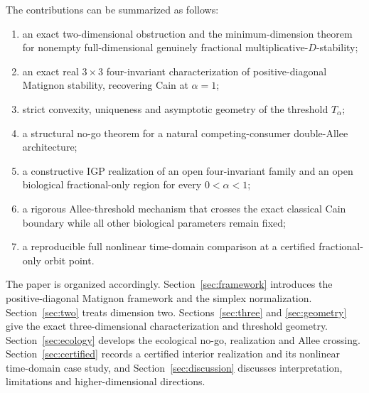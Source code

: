 The contributions can be summarized as follows:
\begin{enumerate}[leftmargin=*,itemsep=1pt]
\item an exact two-dimensional obstruction and the minimum-dimension theorem for nonempty full-dimensional genuinely fractional multiplicative-\(D\)-stability;
\item an exact real \(3\times3\) four-invariant characterization of positive-diagonal Matignon stability, recovering Cain at \(\alpha=1\);
\item strict convexity, uniqueness and asymptotic geometry of the threshold \(T_\alpha\);
\item a structural no-go theorem for a natural competing-consumer double-Allee architecture;
\item a constructive IGP realization of an open four-invariant family and an open biological fractional-only region for every \(0<\alpha<1\);
\item a rigorous Allee-threshold mechanism that crosses the exact classical Cain boundary while all other biological parameters remain fixed;
\item a reproducible full nonlinear time-domain comparison at a certified fractional-only orbit point.
\end{enumerate}

The paper is organized accordingly. Section~\ref{sec:framework} introduces the positive-diagonal Matignon framework and the simplex normalization. Section~\ref{sec:two} treats dimension two. Sections~\ref{sec:three} and \ref{sec:geometry} give the exact three-dimensional characterization and threshold geometry. Section~\ref{sec:ecology} develops the ecological no-go, realization and Allee crossing. Section~\ref{sec:certified} records a certified interior realization and its nonlinear time-domain case study, and Section~\ref{sec:discussion} discusses interpretation, limitations and higher-dimensional directions.
